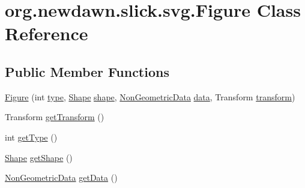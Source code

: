 \hypertarget{classorg_1_1newdawn_1_1slick_1_1svg_1_1_figure}{}\section{org.\+newdawn.\+slick.\+svg.\+Figure Class Reference}
\label{classorg_1_1newdawn_1_1slick_1_1svg_1_1_figure}
\subsection*{Public Member Functions}
\begin{DoxyCompactItemize}
\item 
\mbox{\hyperlink{classorg_1_1newdawn_1_1slick_1_1svg_1_1_figure_af9f7e8db2e90f0502b1a027904f3a00f}{Figure}} (int \mbox{\hyperlink{classorg_1_1newdawn_1_1slick_1_1svg_1_1_figure_a13aa6b5f3b570fcdd83fa792c4df142b}{type}}, \mbox{\hyperlink{classorg_1_1newdawn_1_1slick_1_1geom_1_1_shape}{Shape}} \mbox{\hyperlink{classorg_1_1newdawn_1_1slick_1_1svg_1_1_figure_a8f61c893d97589c745d42f6146d8670e}{shape}}, \mbox{\hyperlink{classorg_1_1newdawn_1_1slick_1_1svg_1_1_non_geometric_data}{Non\+Geometric\+Data}} \mbox{\hyperlink{classorg_1_1newdawn_1_1slick_1_1svg_1_1_figure_a31e90c8351882640950687c7e8587091}{data}}, Transform \mbox{\hyperlink{classorg_1_1newdawn_1_1slick_1_1svg_1_1_figure_a026c30ce2ef9b710c6bd51ff60c0b887}{transform}})
\item 
Transform \mbox{\hyperlink{classorg_1_1newdawn_1_1slick_1_1svg_1_1_figure_a407e6b796ef1ee5b6cd2ce29c9a72464}{get\+Transform}} ()
\item 
int \mbox{\hyperlink{classorg_1_1newdawn_1_1slick_1_1svg_1_1_figure_aa5ea3e073ecdf374f07b9cd4a140ef88}{get\+Type}} ()
\item 
\mbox{\hyperlink{classorg_1_1newdawn_1_1slick_1_1geom_1_1_shape}{Shape}} \mbox{\hyperlink{classorg_1_1newdawn_1_1slick_1_1svg_1_1_figure_a980b7a979c218c2a73897ba47a2b3a17}{get\+Shape}} ()
\item 
\mbox{\hyperlink{classorg_1_1newdawn_1_1slick_1_1svg_1_1_non_geometric_data}{Non\+Geometric\+Data}} \mbox{\hyperlink{classorg_1_1newdawn_1_1slick_1_1svg_1_1_figure_af21423a8fd0c4f77485be8a5de8887eb}{get\+Data}} ()
\end{DoxyCompactItemize}
